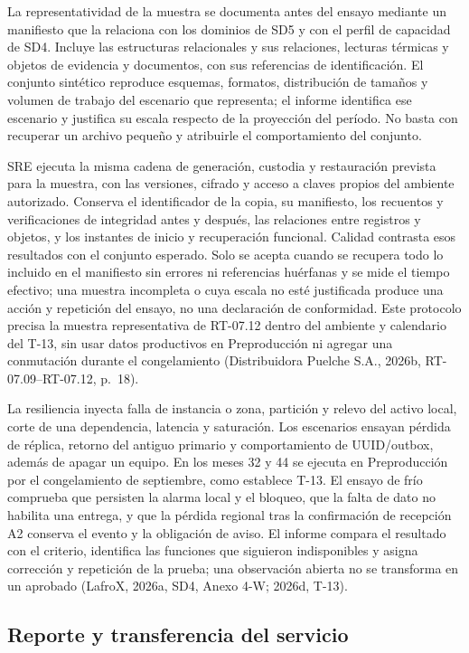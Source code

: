 La representatividad de la muestra se documenta antes del ensayo mediante un manifiesto que la relaciona con los dominios de SD5 y con el perfil de capacidad de SD4. Incluye las estructuras relacionales y sus relaciones, lecturas térmicas y objetos de evidencia y documentos, con sus referencias de identificación. El conjunto sintético reproduce esquemas, formatos, distribución de tamaños y volumen de trabajo del escenario que representa; el informe identifica ese escenario y justifica su escala respecto de la proyección del período. No basta con recuperar un archivo pequeño y atribuirle el comportamiento del conjunto.

SRE ejecuta la misma cadena de generación, custodia y restauración prevista para la muestra, con las versiones, cifrado y acceso a claves propios del ambiente autorizado. Conserva el identificador de la copia, su manifiesto, los recuentos y verificaciones de integridad antes y después, las relaciones entre registros y objetos, y los instantes de inicio y recuperación funcional. Calidad contrasta esos resultados con el conjunto esperado. Solo se acepta cuando se recupera todo lo incluido en el manifiesto sin errores ni referencias huérfanas y se mide el tiempo efectivo; una muestra incompleta o cuya escala no esté justificada produce una acción y repetición del ensayo, no una declaración de conformidad. Este protocolo precisa la muestra representativa de RT-07.12 dentro del ambiente y calendario del T-13, sin usar datos productivos en Preproducción ni agregar una conmutación durante el congelamiento (Distribuidora Puelche S.A., 2026b, RT-07.09--RT-07.12, p.~18).

La resiliencia inyecta falla de instancia o zona, partición y relevo del activo local, corte de una dependencia, latencia y saturación. Los escenarios ensayan pérdida de réplica, retorno del antiguo primario y comportamiento de UUID/outbox, además de apagar un equipo. En los meses 32 y 44 se ejecuta en Preproducción por el congelamiento de septiembre, como establece T-13. El ensayo de frío comprueba que persisten la alarma local y el bloqueo, que la falta de dato no habilita una entrega, y que la pérdida regional tras la confirmación de recepción A2 conserva el evento y la obligación de aviso. El informe compara el resultado con el criterio, identifica las funciones que siguieron indisponibles y asigna corrección y repetición de la prueba; una observación abierta no se transforma en un aprobado (LafroX, 2026a, SD4, Anexo 4-W; 2026d, T-13).

\subsection{Reporte y transferencia del servicio}
\label{subsec:sd11-reporte}

